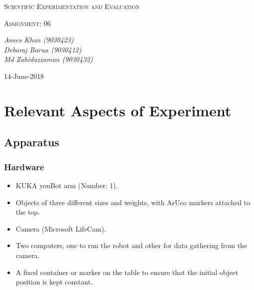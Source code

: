 \documentclass[10pt,a4paper]{article}
\begin{document}
				\begin{titlepage}
				\centering
			
					{\scshape\LARGE Scientific Experimentation and Evaluation\par}
			
					{\scshape\Large Assignment: 06\par}
			
					\vfill
			
					\vfill
					{\Large\itshape Anees Khan (9030423)
						\\Debaraj Barua (9030412)\\
						Md Zahiduzzaman (9030432)
						\par}
					\vfill
			
					{\large 14-June-2018\par}
				\end{titlepage}
				\tableofcontents
				\listoffigures	
				\listoftables
				\newpage
				\section{Relevant Aspects of Experiment}
				\subsection{Apparatus}
					\subsubsection{Hardware}
						\begin{itemize}
							\item KUKA youBot arm (Number: 1).
							\item Objects of three different sizes and weights, with ArUco markers attached to the top.
							\item Camera (Microsoft LifeCam).
							\item Two computers, one to run the robot and other for data gathering from the camera.
							\item A fixed container or marker on the table to ensure that the initial object position is kept constant.
						\end{itemize}
\end{document}
